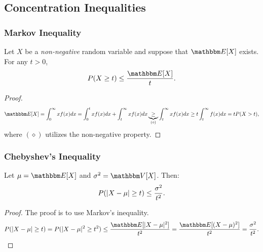             
\subsection{Concentration Inequalities}
    \subsubsection{Markov Inequality}
     Let $X$ be a \emph{non-negative} random variable and suppose that $\E[X]$ exists. 
     For any $t > 0$,
        \begin{equation}
            P(X \ge t) \le \frac{\E[X]}{t}.
        \end{equation}
    \begin{proof}
        \begin{equation}
            \E[X] = \int_{0}^{\infty}{ x f(x)} dx = \int_{0}^{t} x f(x) dx + \int_{t}^{\infty} x f(x) dx \underbrace{\ge}_{(\diamond)} \int_{t}^{\infty} x f(x) dx \ge t \int_{t}^{\infty} f(x) dx = t P(X > t),
        \end{equation}
    where $(\diamond)$ utilizes the non-negative property.
    \end{proof}
    
    \subsubsection{Chebyshev's Inequality}
    Let $\mu = \E[X]$ and $\sigma^2 = \Var[X]$.
    Then:
        \begin{equation}
            P(| X - \mu | \ge t) \le \frac{\sigma^2}{t^2}.
        \end{equation}
    \begin{proof}
        The proof is to use Markov's inequality.
        \begin{equation}
            P(\Abs{X - \mu} \ge t) = P(\Abs{X - \mu}^2 \ge t^2) \le \frac{\E[\Abs{X - \mu}^2]}{t^2} =  \frac{\E[(X - \mu)^2]}{t^2} = \frac{\sigma^2}{t^2}.
        \end{equation}
    \end{proof}
    
